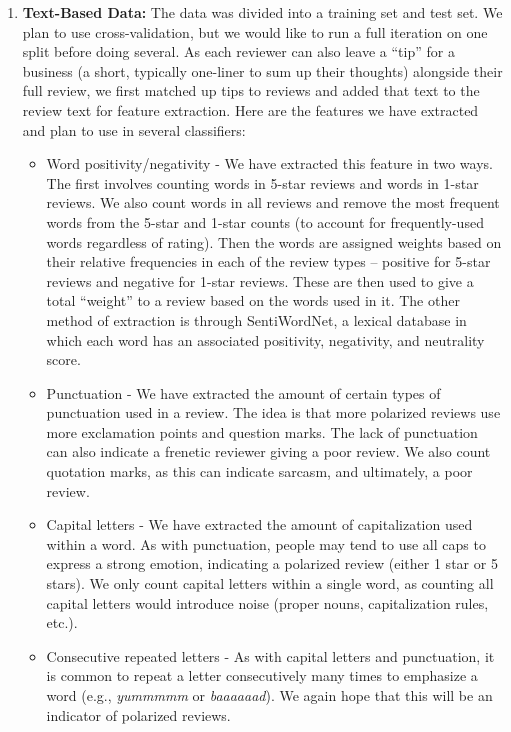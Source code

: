 \documentclass[12pt]{article}
\begin{document}
\begin{enumerate}
\begin{itemize}
\end{itemize}

\item 
\textbf{Text-Based Data:}
The data was divided into a training set and test set. We plan to use cross-validation, but we would like to run a full iteration on one split before doing several. As each reviewer can also leave a ``tip'' for a business (a short, typically one-liner to sum up their thoughts) alongside their full review, we first matched up tips to reviews and added that text to the review text for feature extraction. Here are the features we have extracted and plan to use in several classifiers:
\begin{itemize}
\item Word positivity/negativity - We have extracted this feature in two ways. The first involves counting words in 5-star reviews and words in 1-star reviews. We also count words in all reviews and remove the most frequent words from the 5-star and 1-star counts (to account for frequently-used words regardless of rating). Then the words are assigned weights based on their relative frequencies in each of the review types -- positive for 5-star reviews and negative for 1-star reviews. These are then used to give a total ``weight'' to a review based on the words used in it. The other method of extraction is through SentiWordNet, a lexical database in which each word has an associated positivity, negativity, and neutrality score. 
\item Punctuation - We have extracted the amount of certain types of punctuation used in a review. The idea is that more polarized reviews use more exclamation points and question marks. The lack of punctuation can also indicate a frenetic reviewer giving a poor review. We also count quotation marks, as this can indicate sarcasm, and ultimately, a poor review.

\item Capital letters - We have extracted the amount of capitalization used within a word. As with punctuation, people may tend to use all caps to express a strong emotion, indicating a polarized review (either 1 star or 5 stars). We only count capital letters within a single word, as counting all capital letters would introduce noise (proper nouns, capitalization rules, etc.).

\item Consecutive repeated letters - As with capital letters and punctuation, it is common to repeat a letter consecutively many times to emphasize a word (e.g., \emph{yummmmm} or \emph{baaaaaad}). We again hope that this will be an indicator of polarized reviews.


\end{itemize}
\end{enumerate}
\end{document}
